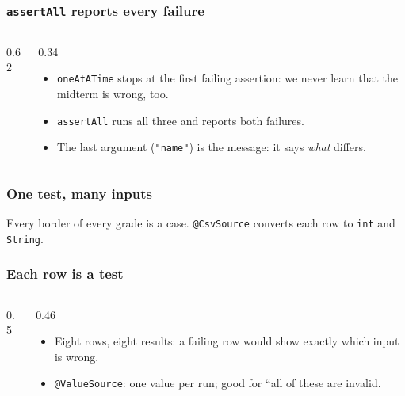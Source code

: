 \documentclass[aspectratio=169,10pt,compress]{beamer}
\begin{document}
\begin{frame}[t,fragile] \frametitle{\texttt{assertAll} reports every failure}
  \begin{columns}[T]
    \begin{column}{0.62\textwidth}
    \end{column}
    \begin{column}{0.34\textwidth}
      \begin{itemize}\small
        \item \texttt{oneAtATime} stops at the first failing assertion: we never learn that the midterm is wrong, too.
        \item \texttt{assertAll} runs all three and reports both failures.
        \item The last argument (\texttt{"name"}) is the message: it says \emph{what} differs.
      \end{itemize}
    \end{column}
  \end{columns}
\end{frame}





\begin{frame}[t,fragile] \frametitle{One test, many inputs}
  \small Every border of every grade is a case. \texttt{@CsvSource} converts each row to \texttt{int} and \texttt{String}.
\end{frame}




\begin{frame}[t,fragile] \frametitle{Each row is a test}
  \begin{columns}[T]
    \begin{column}{0.5\textwidth}
    \end{column}
    \begin{column}{0.46\textwidth}
      \begin{itemize}\small
        \item Eight rows, eight results: a failing row would show exactly which input is wrong.
        \item \texttt{@ValueSource}: one value per run; good for ``all of these are invalid.
      \end{itemize}
    \end{column}
  \end{columns}
\end{frame}
\end{document}
